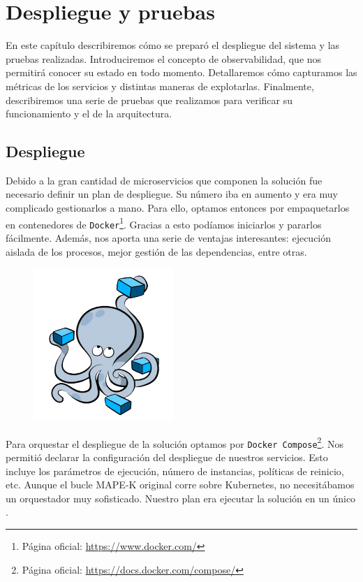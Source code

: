 \chapter{Despliegue y pruebas}
\label{chap:despliegue}

En este capítulo describiremos cómo se preparó el despliegue del sistema y las pruebas realizadas. Introduciremos el concepto de observabilidad, que nos permitirá conocer su estado en todo momento. Detallaremos cómo capturamos las métricas de los servicios y distintas maneras de explotarlas. Finalmente, describiremos una serie de pruebas que realizamos para verificar su funcionamiento y el de la arquitectura.

\section{Despliegue}

Debido a la gran cantidad de microservicios que componen la solución fue necesario definir un plan de despliegue. Su número iba en aumento y era muy complicado gestionarlos a mano. Para ello, optamos entonces por empaquetarlos en contenedores de \texttt{Docker}\footnote{Página oficial: \url{https://www.docker.com/}}. Gracias a esto podíamos iniciarlos y pararlos fácilmente. Además, nos aporta una serie de ventajas interesantes: ejecución aislada de los procesos, mejor gestión de las dependencias, entre otras. \cite{newmanBuildingMicroservicesDesigning2021,delatorreNETMicroservicesArchitecture2021}

\begin{figure}
  \vspace{-25pt}
  \centering
  \includegraphics[scale=0.95]{cap_despliegue/images/docker-compose-logo}
  \vspace{-15pt}
\end{figure}

Para orquestar el despliegue de la solución optamos por \texttt{Docker Compose}\footnote{Página oficial: \url{https://docs.docker.com/compose/}}. Nos permitió declarar la configuración del despliegue de nuestros servicios. Esto incluye los parámetros de ejecución, número de instancias, políticas de reinicio, etc. Aunque el bucle MAPE-K  original corre sobre Kubernetes, no necesitábamos un orquestador muy sofisticado. Nuestro plan era ejecutar la solución en un único .

